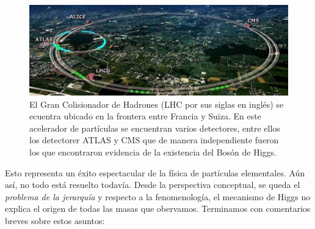 \begin{figure}
	\centering
	\includegraphics[scale=0.4]{images/lhc.jpg}
	\caption{El Gran Colisionador de Hadrones (LHC por sus siglas en ingl\'es) se ecuentra ubicado en la frontera entre Francia y Suiza. En este acelerador de part\'iculas se encuentran varios detectores, entre ellos los detectorer ATLAS y CMS que de manera independiente fueron los que encontraron evidencia de la existencia del Bos\'on de Higgs.}
\end{figure}

Esto representa un \'exito espectacular de la f\'isica de part\'iculas
elementales. A\'un as\'i, no todo est\'a resuelto todav\'ia. Desde la
perspectiva conceptual, se queda el {\em problema de la jerarqu\'ia}
y respecto a la fenomenolog\'ia, el mecanismo de Higgs no explica
el origen de todas las masas que obervamos. Terminamos con
comentarios breves sobre estos asuntos:

